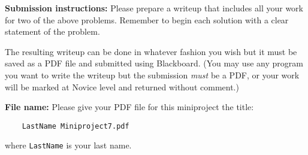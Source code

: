 \documentclass[11pt,letterpaper]{article}
\begin{document}
\hrulefill

\noindent
\textbf{Submission instructions:} Please prepare a writeup that includes all your work for two of the above problems. Remember to begin each solution with a clear statement of the problem. 

The resulting writeup can be done in whatever fashion you wish but it must be saved as a PDF file and submitted using Blackboard. (You may use any program you want to write the writeup but the submission \emph{must} be a PDF, or your work will be marked at Novice level and returned without comment.) 

\noindent
\textbf{File name:} Please give your PDF file for this miniproject the title: 
\begin{verbatim}
	LastName Miniproject7.pdf
\end{verbatim}
where \texttt{LastName} is your last name. 
\end{document}
